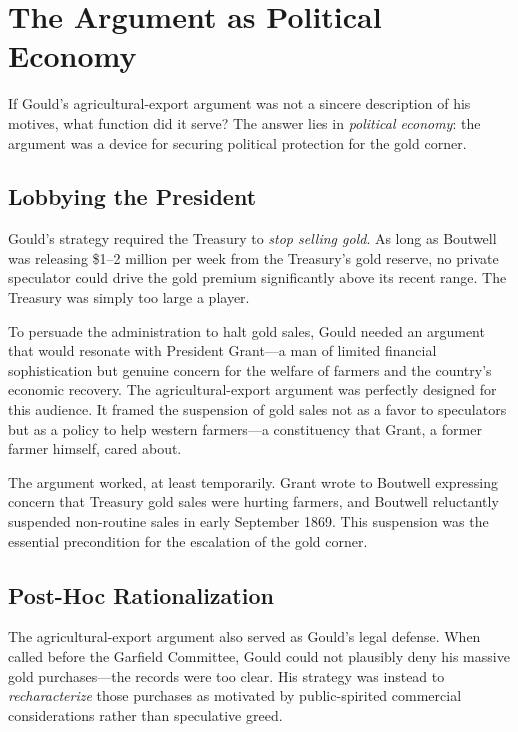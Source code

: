 \documentclass[12pt]{article}
\begin{document}
\section{The Argument as Political Economy}

If Gould's agricultural-export argument was not a sincere description of 
his motives, what function did it serve? The answer lies in \emph{political 
economy}: the argument was a device for securing political protection 
for the gold corner.

\subsection{Lobbying the President}

Gould's strategy required the Treasury to \emph{stop selling gold}. As 
long as Boutwell was releasing \$1--2 million per week from the 
Treasury's gold reserve, no private speculator could drive the gold 
premium significantly above its recent range. The Treasury was simply 
too large a player.

To persuade the administration to halt gold sales, Gould needed an 
argument that would resonate with President Grant---a man of limited 
financial sophistication but genuine concern for the welfare of 
farmers and the country's economic recovery. The 
agricultural-export argument was perfectly designed for this audience. 
It framed the suspension of gold sales not as a favor to speculators 
but as a policy to help western farmers---a constituency that Grant, 
a former farmer himself, cared about.

The argument worked, at least temporarily. Grant wrote to Boutwell 
expressing concern that Treasury gold sales were hurting farmers, and 
Boutwell reluctantly suspended non-routine sales in early September 
1869. This suspension was the essential precondition for the escalation 
of the gold corner.

\subsection{Post-Hoc Rationalization}

The agricultural-export argument also served as Gould's legal defense. 
When called before the Garfield Committee, Gould could not plausibly 
deny his massive gold purchases---the records were too clear. His 
strategy was instead to \emph{recharacterize} those purchases as 
motivated by public-spirited commercial considerations rather than 
speculative greed.
\end{document}
